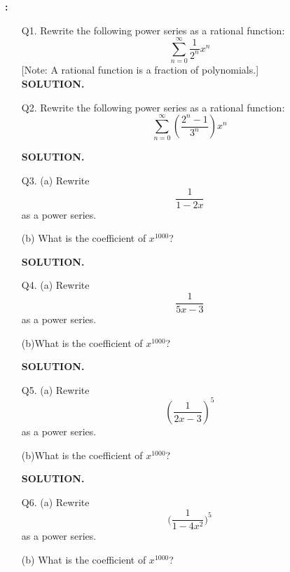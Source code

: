 \documentclass[a4paper,12pt]{article}
\begin{document}
\topmatter

\centerline{{\bf \COURSENUMBER: \COURSENAME}}
\centerline{{\bf \TITLE}}

\vskip 0.4cm

\begin{enumerate}

\item[Q1.] Rewrite the following power series as a rational function:
\[
\sum^\infty_{n = 0} \frac{1}{2^n} x^n
\]
[Note: A rational function is a fraction of polynomials.]
\\

{\bf SOLUTION.}





\newpage
\item[Q2.] Rewrite the following power series as a rational function:
\[
\sum^\infty_{n = 0} \left( \frac{2^n - 1}{3^n}  \right) x^n
\]

{\bf SOLUTION.}




\newpage
\item[Q3.] (a) Rewrite
\[
\frac{1}{1 - 2x}
\]
as a power series. 

(b) What is the coefficient of $x^{1000}$?

{\bf SOLUTION.}






\newpage
\item[Q4.]
(a) Rewrite
\[
\frac{1}{5x - 3}
\]
as a power series. 


(b)What is the coefficient of $x^{1000}$?

{\bf SOLUTION.}






\newpage
\item[Q5.]
(a) Rewrite
\[
\left( 
\frac{1}{2x - 3}
\right)^5
\]
as a power series. 


(b)What is the coefficient of $x^{1000}$?

{\bf SOLUTION.}






\newpage
\item[Q6.]
(a) Rewrite
\[
\biggl( 
\frac{1}{1 - 4x^2}
\biggr)^5
\]
as a power series. 

(b) What is the coefficient of $x^{1000}$?


\end{enumerate}
\end{document}
